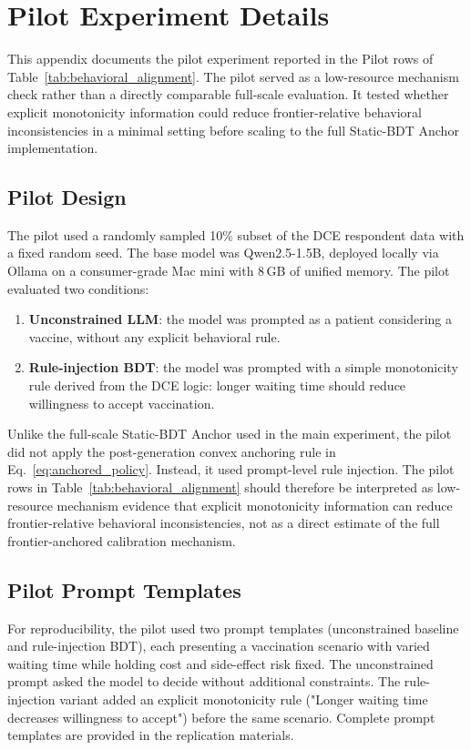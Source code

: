 \documentclass[11pt]{article}
\begin{document}
\section{Pilot Experiment Details}
\label{app:pilot}

This appendix documents the pilot experiment reported in the Pilot rows of Table~\ref{tab:behavioral_alignment}. The pilot served as a low-resource mechanism check rather than a directly comparable full-scale evaluation. It tested whether explicit monotonicity information could reduce frontier-relative behavioral inconsistencies in a minimal setting before scaling to the full Static-BDT Anchor implementation.

\subsection{Pilot Design}

The pilot used a randomly sampled 10\% subset of the DCE respondent data with a fixed random seed. The base model was Qwen2.5-1.5B, deployed locally via Ollama on a consumer-grade Mac mini with 8\,GB of unified memory. The pilot evaluated two conditions:

\begin{enumerate}
    \item \textbf{Unconstrained LLM}: the model was prompted as a patient considering a vaccine, without any explicit behavioral rule.
    \item \textbf{Rule-injection BDT}: the model was prompted with a simple monotonicity rule derived from the DCE logic: longer waiting time should reduce willingness to accept vaccination.
\end{enumerate}

Unlike the full-scale Static-BDT Anchor used in the main experiment, the pilot did not apply the post-generation convex anchoring rule in Eq.~\eqref{eq:anchored_policy}. Instead, it used prompt-level rule injection. The pilot rows in Table~\ref{tab:behavioral_alignment} should therefore be interpreted as low-resource mechanism evidence that explicit monotonicity information can reduce frontier-relative behavioral inconsistencies, not as a direct estimate of the full frontier-anchored calibration mechanism.

\subsection{Pilot Prompt Templates}

For reproducibility, the pilot used two prompt templates (unconstrained baseline and rule-injection BDT), each presenting a vaccination scenario with varied waiting time while holding cost and side-effect risk fixed. The unconstrained prompt asked the model to decide without additional constraints. The rule-injection variant added an explicit monotonicity rule ("Longer waiting time decreases willingness to accept") before the same scenario. Complete prompt templates are provided in the replication materials.
\end{document}
